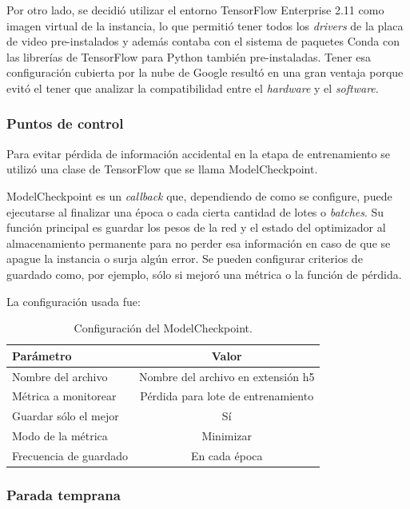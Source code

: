 Por otro lado, se decidió utilizar el entorno TensorFlow Enterprise 2.11 como imagen virtual de la instancia, lo que permitió tener todos los \textit{drivers} de la placa de video pre-instalados y además contaba con el sistema de paquetes Conda con las librerías de TensorFlow para Python también pre-instaladas. Tener esa configuración cubierta por la nube de Google resultó en una gran ventaja porque evitó el tener que analizar la compatibilidad entre el \textit{hardware} y el \textit{software}.

\subsubsection{Puntos de control}

Para evitar pérdida de información accidental en la etapa de entrenamiento se utilizó una clase de TensorFlow que se llama ModelCheckpoint.

ModelCheckpoint es un \textit{callback} que, dependiendo de como se configure, puede ejecutarse al finalizar una época o cada cierta cantidad de lotes o \textit{batches}. Su función principal es guardar los pesos de la red y el estado del optimizador al almacenamiento permanente para no perder esa información en caso de que se apague la instancia o surja algún error. Se pueden configurar criterios de guardado como, por ejemplo, sólo si mejoró una métrica o la función de pérdida.

La configuración usada fue:
\begin{table}[h]
	\centering
	\caption[Configuración ModelCheckpoint]{Configuración del ModelCheckpoint.}
	\begin{tabular}{l c}    
		\toprule
		\textbf{Parámetro}			& 			\textbf{Valor}  \\
		\midrule	
		Nombre del archivo			& 			Nombre del archivo en extensión h5  \\
		Métrica a monitorear 		& 			Pérdida para lote de entrenamiento  \\
		Guardar sólo el mejor		&			Sí \\
		Modo de la métrica 			& 			Minimizar \\
		Frecuencia de guardado 		& 			En cada época  \\
		\bottomrule
		\hline
	\end{tabular}
	\label{tab:checkpoint}
\end{table}

\subsubsection{Parada temprana}

